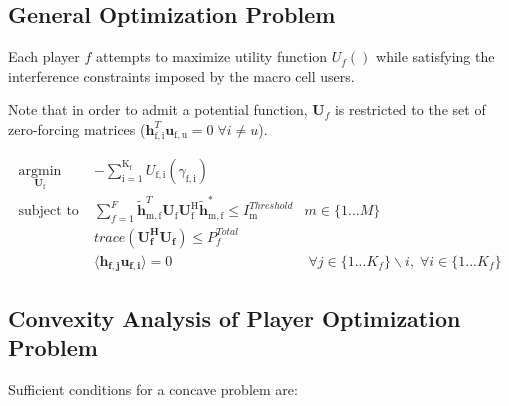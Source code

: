 \documentclass[12pt,a4paper]{report}
\begin{document}
\subsection{General Optimization Problem}

Each player $f$ attempts to maximize utility function $U_f()$ while satisfying the interference constraints imposed by the macro cell users.
\par

Note that in order to admit a potential function, $\mathbf{U}_f$ is restricted to the set of zero-forcing matrices ($\mathbf{h}_{\mathrm{f,i}}^T \mathbf{u}_{\mathrm{f,u}}=0 \; \forall  i \neq u $).


	\begin{subequations}
	\label{optim}
	\begin{align}
	    \underset{\mathbf{U}_{\mathrm{f}} }{\text{argmin}} \;
	    & - \sum_{\mathrm{i=1}}^{\mathrm{K_f}}
    	U_{\mathrm{f,i}}(\gamma_{\mathrm{f,i}}) \label{player_opt} \\
	    \text{subject to} \; &
	   \sum^F_{f=1} \mathbf{\tilde{h}}_{\mathrm{m,f}}^T  \mathbf{U_{\mathrm{f}}}		
	\mathbf{U_{\mathrm{f}}^{\mathrm{H}}} \mathbf{\tilde{h}_{\mathrm{m,f}}^*} \leq I^{Threshold}		
	_{\mathrm{m}} & m \in \{1 ...M\} 
		\label{interference_const_gen}\\
        & trace(\mathbf{U_f^H}\mathbf{U_f}) \leq P^{Total}_{f} \label{power_const_gen}\\
        & \langle \mathbf{h_{f,j}}\mathbf{u_{f,i}} \rangle =0\ & \; \forall j \in \{1... K_f\}\backslash i ,\; \forall i \in \{1 ... K_f\} \label{zf_const_gen}
	\end{align}
	\end{subequations}
	
\subsection{Convexity Analysis of Player Optimization Problem}

Sufficient conditions for a concave problem are:
\end{document}
